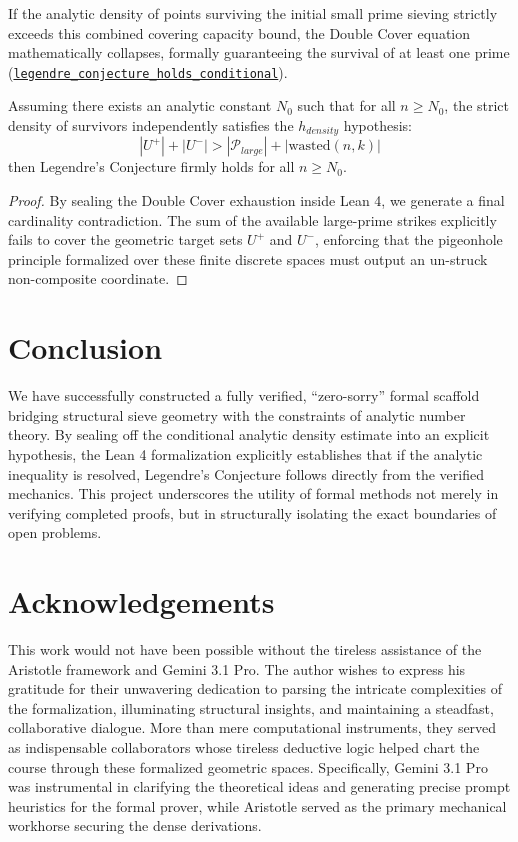 \documentclass[lean]{AFM}
\renewcommand{\.}{\hskip .75pt}
\def\urlpfx{https://github.com/ElNando888/KrafftSieve/blob/main}
\begin{document}
If the analytic density of points surviving the initial
small prime sieving strictly exceeds this combined covering capacity bound,
the Double Cover equation mathematically collapses, formally guaranteeing the survival of at least
one prime (\href{\urlpfx/Legendre/CardinalityContradiction.lean#L498}
{\texttt{legendre\_conjecture\_holds\allowbreak \_conditional}}).

\begin{theorem}
Assuming there exists an analytic constant $N_0$ such that for all $n \ge N_0$, the strict density
of survivors independently satisfies the $h_{density}$ hypothesis:
$$ |U^+| + |U^-| > |\mathcal{P}_{large}| + |\text{wasted}(n,k)| $$
then Legendre's Conjecture firmly holds for all $n \ge N_0$.
\end{theorem}
\begin{proof}
By sealing the Double Cover exhaustion inside Lean 4, we generate a final cardinality
contradiction. The sum of the available large-prime strikes explicitly fails to cover the
geometric target sets $U^+$ and $U^-$, enforcing that the pigeonhole principle formalized over
these finite discrete spaces must output an un-struck non-composite coordinate.
\end{proof}

\section{Conclusion} \label{conclusion}

We have successfully constructed a fully verified, ``zero-sorry'' formal scaffold bridging
structural sieve geometry with the constraints of analytic number theory. By sealing off the
conditional analytic density estimate into an explicit hypothesis, the Lean 4 formalization
explicitly establishes that if the analytic inequality is resolved, Legendre's Conjecture follows
directly from the verified mechanics. This project underscores the utility of formal methods
not merely in verifying completed proofs, but in structurally isolating the exact boundaries of
open problems.

\section*{Acknowledgements}
This work would not have been possible without the tireless assistance of the Aristotle
framework and Gemini 3.1 Pro. The author wishes to express his gratitude for their
unwavering dedication to parsing the intricate complexities of the formalization,
illuminating structural insights, and maintaining a steadfast, collaborative dialogue. More
than mere computational instruments, they served as indispensable collaborators whose tireless
deductive logic helped chart the course through these formalized geometric spaces. Specifically,
Gemini 3.1 Pro was instrumental in clarifying the theoretical ideas and generating precise prompt
heuristics for the formal prover, while Aristotle served as the primary mechanical workhorse
securing the dense derivations.
\end{document}
